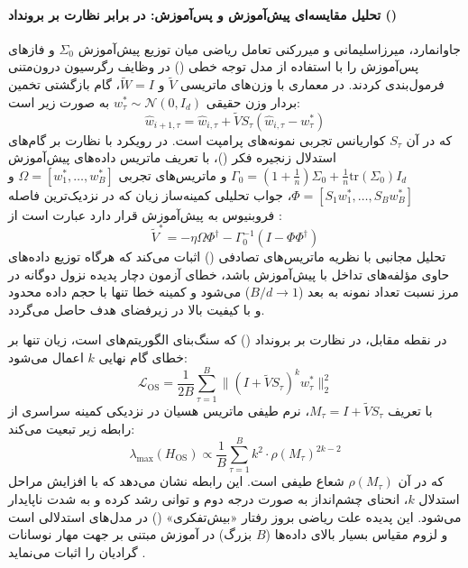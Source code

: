 \paragraph*{تحلیل مقایسه‌ای پیش‌آموزش و پس‌آموزش:  در برابر نظارت بر برونداد ()}
جاوانمارد، میرزاسلیمانی و میررکنی \cite{javanmard2026theoretical} تعامل ریاضی میان توزیع پیش‌آموزش $\Sigma_0$ و فازهای پس‌آموزش را با استفاده از مدل توجه خطی () در وظایف رگرسیون درون‌متنی فرمول‌بندی کردند. در معماری  با وزن‌های ماتریسی $\tilde{V}$ و $\tilde{W}=I$، گام بازگشتی تخمین بردار وزن حقیقی $w^*_\tau \sim \mathcal{N}(0, I_d)$ به صورت زیر است:
\begin{equation}
    \hat{w}_{i+1, \tau} = \hat{w}_{i, \tau} + \tilde{V} S_\tau (\hat{w}_{i, \tau} - w^*_\tau)
\end{equation}
که در آن $S_\tau$ کواریانس تجربی نمونه‌های پرامپت است. 
در رویکرد  با نظارت بر گام‌های استدلال زنجیره فکر ()، با تعریف ماتریس داده‌های پیش‌آموزش $\Gamma_0 = (1 + \frac{1}{n})\Sigma_0 + \frac{1}{n}\text{tr}(\Sigma_0)I_d$ و ماتریس‌های تجربی $\Omega = [w^*_1, \dots, w^*_B]$ و $\Phi = [S_1 w^*_1, \dots, S_B w^*_B]$، جواب تحلیلی کمینه‌ساز زیان که در نزدیک‌ترین فاصله فروبنیوس به پیش‌آموزش قرار دارد عبارت است از \cite{javanmard2026theoretical}:
\begin{equation}
    \tilde{V}^* = -\eta \Omega \Phi^\dagger - \Gamma_0^{-1}(I - \Phi \Phi^\dagger)
\end{equation}
تحلیل مجانبی با نظریه ماتریس‌های تصادفی () اثبات می‌کند که هرگاه توزیع داده‌های  حاوی مؤلفه‌های تداخل با پیش‌آموزش باشد، خطای آزمون دچار پدیده نزول دوگانه در مرز نسبت تعداد نمونه به بعد ($B/d \to 1$) می‌شود و کمینه خطا تنها با حجم داده محدود و با کیفیت بالا در زیرفضای هدف حاصل می‌گردد.

در نقطه مقابل، در نظارت بر برونداد () که سنگ‌بنای الگوریتم‌های  است، زیان تنها بر خطای گام نهایی $k$ اعمال می‌شود:
\begin{equation}
    \mathcal{L}_{\text{OS}} = \frac{1}{2B} \sum_{\tau=1}^B \|(I + \tilde{V} S_\tau)^k w^*_\tau\|_2^2
\end{equation}
با تعریف $M_\tau = I + \tilde{V} S_\tau$، نرم طیفی ماتریس هسیان در نزدیکی کمینه سراسری از رابطه زیر تبعیت می‌کند:
\begin{equation}
    \lambda_{\max}(H_{\text{OS}}) \propto \frac{1}{B} \sum_{\tau=1}^B k^2 \cdot \rho(M_\tau)^{2k-2}
\end{equation}
که در آن $\rho(M_\tau)$ شعاع طیفی است. این رابطه نشان می‌دهد که با افزایش مراحل استدلال $k$، انحنای چشم‌انداز به صورت درجه دوم و توانی رشد کرده و به شدت ناپایدار می‌شود. این پدیده علت ریاضی بروز رفتار «بیش‌تفکری» () در مدل‌های استدلالی است و لزوم مقیاس بسیار بالای داده‌ها ($B$ بزرگ) در آموزش مبتنی بر  جهت مهار نوسانات گرادیان را اثبات می‌نماید \cite{javanmard2026theoretical}.

